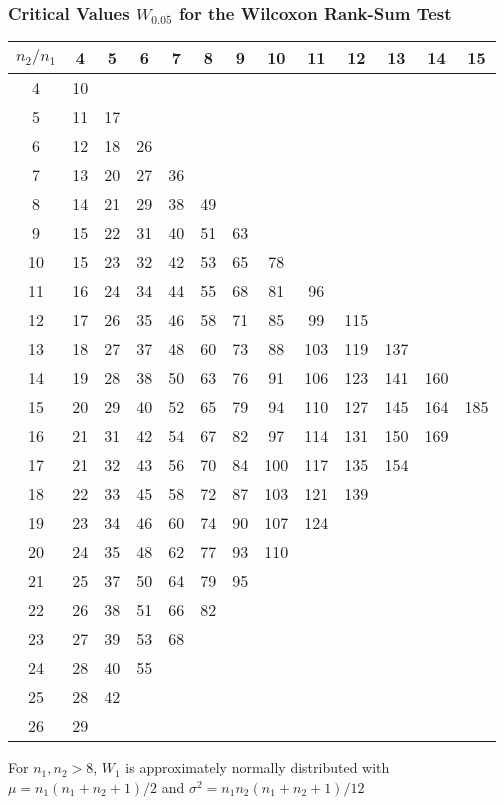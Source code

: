 \subsubsection*{Critical Values  $W_{0.05}$ for the Wilcoxon Rank-Sum Test} %


\begin{tabular}[t]{c|cccccccccccc}
$n_2/n_1$ & 4  & 5 & 6 & 7 & 8 & 9 & 10 & 11 & 12 & 13 & 14 & 15 \\
\hline
4  & 10 \\
5  & 11 & 17 \\
6  & 12 & 18 & 26 \\
7  & 13 & 20 & 27 & 36 \\
8  & 14 & 21 & 29 & 38 & 49 \\
9  & 15 & 22 & 31 & 40 & 51 & 63 \\
10 & 15 & 23 & 32 & 42 & 53 & 65 &  78 \\
11 & 16 & 24 & 34 & 44 & 55 & 68 &  81 &  96 \\
12 & 17 & 26 & 35 & 46 & 58 & 71 &  85 &  99 & 115 \\
13 & 18 & 27 & 37 & 48 & 60 & 73 &  88 & 103 & 119 & 137 \\
14 & 19 & 28 & 38 & 50 & 63 & 76 &  91 & 106 & 123 & 141 & 160 \\
15 & 20 & 29 & 40 & 52 & 65 & 79 &  94 & 110 & 127 & 145 & 164 & 185 \\
16 & 21 & 31 & 42 & 54 & 67 & 82 &  97 & 114 & 131 & 150 & 169 \\
17 & 21 & 32 & 43 & 56 & 70 & 84 & 100 & 117 & 135 & 154 \\
18 & 22 & 33 & 45 & 58 & 72 & 87 & 103 & 121 & 139 \\
19 & 23 & 34 & 46 & 60 & 74 & 90 & 107 & 124 \\
20 & 24 & 35 & 48 & 62 & 77 & 93 & 110 \\
21 & 25 & 37 & 50 & 64 & 79 & 95 \\
22 & 26 & 38 & 51 & 66 & 82 \\
23 & 27 & 39 & 53 & 68 \\
24 & 28 & 40 & 55 \\
25 & 28 & 42 \\
26 & 29 \\
\hline
\end{tabular}

For $n_1,n_2 > 8$, $W_1$ is approximately normally distributed
with $\mu=n_1(n_1+n_2+1)/2$
and $\sigma^2=n_1n_2(n_1+n_2+1)/12$

